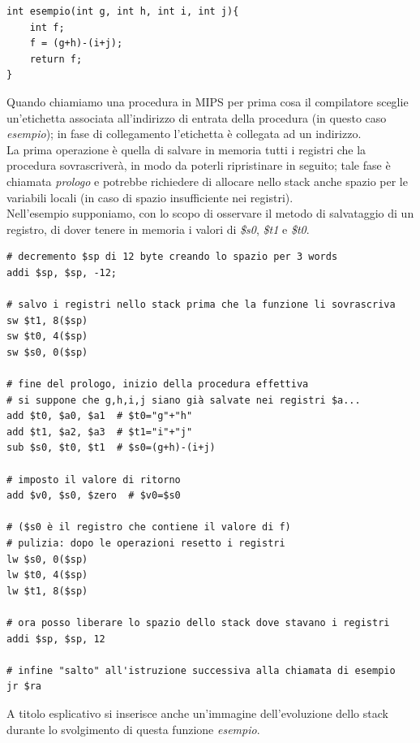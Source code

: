 \documentclass[class=book, crop=false]{standalone}
\begin{document}
\begin{verbatim}
int esempio(int g, int h, int i, int j){
	int f;
	f = (g+h)-(i+j);
	return f;
}
\end{verbatim}

Quando chiamiamo una procedura in MIPS per prima cosa il compilatore sceglie un’etichetta associata all’indirizzo di entrata della procedura (in questo caso \emph{esempio}); in fase di collegamento l'etichetta è collegata ad un indirizzo.\\
La prima operazione è quella di salvare in memoria tutti i registri che la procedura sovrascriverà, in modo da poterli ripristinare in seguito; tale fase è chiamata \emph{prologo} e potrebbe richiedere di allocare nello stack anche spazio per le variabili locali (in caso di spazio insufficiente nei registri).\\
Nell'esempio supponiamo, con lo scopo di osservare il metodo di salvataggio di un registro, di dover tenere in memoria i valori di \emph{\$s0}, \emph{\$t1} e \emph{\$t0}.

\begin{verbatim}
# decremento $sp di 12 byte creando lo spazio per 3 words
addi $sp, $sp, -12;

# salvo i registri nello stack prima che la funzione li sovrascriva
sw $t1, 8($sp)
sw $t0, 4($sp)
sw $s0, 0($sp)

# fine del prologo, inizio della procedura effettiva
# si suppone che g,h,i,j siano già salvate nei registri $a...
add $t0, $a0, $a1  # $t0="g"+"h"
add $t1, $a2, $a3  # $t1="i"+"j"
sub $s0, $t0, $t1  # $s0=(g+h)-(i+j)

# imposto il valore di ritorno
add $v0, $s0, $zero  # $v0=$s0

# ($s0 è il registro che contiene il valore di f)
# pulizia: dopo le operazioni resetto i registri
lw $s0, 0($sp)
lw $t0, 4($sp)
lw $t1, 8($sp)

# ora posso liberare lo spazio dello stack dove stavano i registri
addi $sp, $sp, 12

# infine "salto" all'istruzione successiva alla chiamata di esempio
jr $ra
\end{verbatim}

A titolo esplicativo si inserisce anche un'immagine dell'evoluzione dello stack durante lo svolgimento di questa funzione \emph{esempio}.
\end{document}
